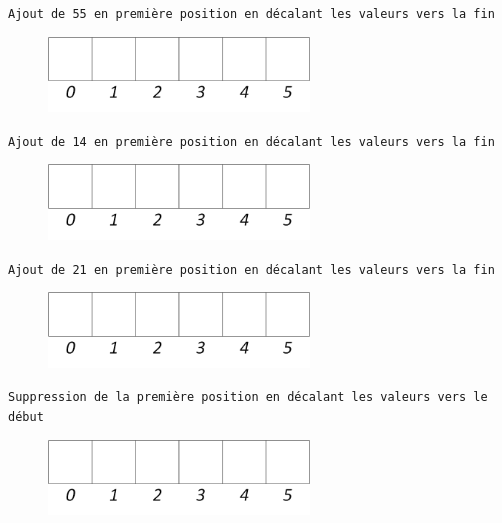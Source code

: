 \documentclass[11pt,a4paper]{article}
\begin{document}
\begin{center}

\texttt{Ajout de 55 en première position en décalant les valeurs vers la fin}

\begin{figure}[ht!]
\centering
\centerline{  %
\includegraphics[height=2cm]{img/Liste_t_vide.png}
}
\end{figure}


\texttt{Ajout de 14 en première position en décalant les valeurs vers la fin}

\begin{figure}[ht!]
\centering
\centerline{  %
\includegraphics[height=2cm]{img/Liste_t_vide.png}
}
\end{figure}


\texttt{Ajout de 21 en première position en décalant les valeurs vers la fin}

\begin{figure}[ht!]
\centering
\centerline{  %
\includegraphics[height=2cm]{img/Liste_t_vide.png}
}
\end{figure}


\texttt{Suppression de la première position en décalant les valeurs vers le début}

\begin{figure}[ht!]
\centering
\centerline{  %
\includegraphics[height=2cm]{img/Liste_t_vide.png}
}
\end{figure}



\end{center}
\end{document}

